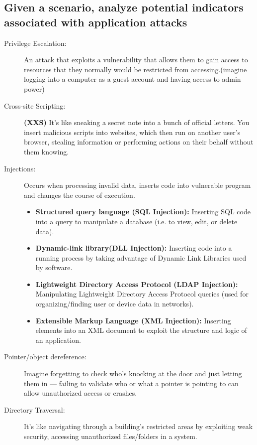 \begin{fullwidth}    
    \subsection{Given a scenario, analyze potential indicators associated with application attacks}
    \begin{description}
        \item[Privilege Escalation:] An attack that exploits a vulnerability that allows them to gain access to resources that they normally would be restricted from accessing.(imagine logging into a computer as a guest account and having access to admin power)
        \item[Cross-site Scripting:]\textbf{(XXS)} It’s like sneaking a secret note into a bunch of official letters. You insert malicious scripts into websites, which then run on another user’s browser, stealing information or performing actions on their behalf without them knowing.
        \item[Injections:] Occurs when processing invalid data, inserts code into vulnerable program and changes the course of execution.
        \begin{itemize}
            \item \textbf{Structured query language (SQL Injection):} Inserting SQL code into a query to manipulate a database (i.e. to view, edit, or delete data).
            \item \textbf{Dynamic-link library(DLL Injection):} Inserting code into a running process by taking advantage of Dynamic Link Libraries used by software.
            \item \textbf{ Lightweight Directory Access Protocol (LDAP Injection):} Manipulating Lightweight Directory Access Protocol queries (used for organizing/finding user or device data in networks).
            \item \textbf{ Extensible Markup Language (XML Injection):} Inserting elements into an XML document to exploit the structure and logic of an application.
        \end{itemize}
        \item[Pointer/object dereference:] Imagine forgetting to check who’s knocking at the door and just letting them in — failing to validate who or what a pointer is pointing to can allow unauthorized access or crashes.
        \item[Directory Traversal:] It’s like navigating through a building’s restricted areas by exploiting weak security, accessing unauthorized files/folders in a system.

\end{description}
\end{fullwidth}
